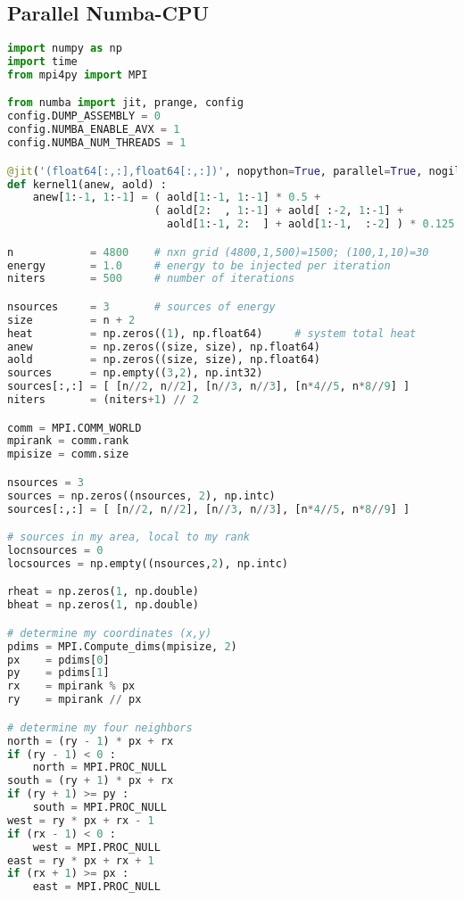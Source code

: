 \subsection{Parallel Numba-CPU}
\begin{lstlisting}[language=Python, caption={Parallel Numba-CPU implementation of the stencil test case.}]
import numpy as np
import time
from mpi4py import MPI   

from numba import jit, prange, config
config.DUMP_ASSEMBLY = 0
config.NUMBA_ENABLE_AVX = 1
config.NUMBA_NUM_THREADS = 1

@jit('(float64[:,:],float64[:,:])', nopython=True, parallel=True, nogil=True) 
def kernel1(anew, aold) :
    anew[1:-1, 1:-1] = ( aold[1:-1, 1:-1] * 0.5 + 
                       ( aold[2:  , 1:-1] + aold[ :-2, 1:-1] +
                         aold[1:-1, 2:  ] + aold[1:-1,  :-2] ) * 0.125 )

n            = 4800    # nxn grid (4800,1,500)=1500; (100,1,10)=30
energy       = 1.0     # energy to be injected per iteration
niters       = 500     # number of iterations

nsources     = 3       # sources of energy
size         = n + 2
heat         = np.zeros((1), np.float64)     # system total heat
anew         = np.zeros((size, size), np.float64)
aold         = np.zeros((size, size), np.float64)
sources      = np.empty((3,2), np.int32)
sources[:,:] = [ [n//2, n//2], [n//3, n//3], [n*4//5, n*8//9] ]
niters       = (niters+1) // 2

comm = MPI.COMM_WORLD
mpirank = comm.rank
mpisize = comm.size

nsources = 3
sources = np.zeros((nsources, 2), np.intc)
sources[:,:] = [ [n//2, n//2], [n//3, n//3], [n*4//5, n*8//9] ]

# sources in my area, local to my rank
locnsources = 0
locsources = np.empty((nsources,2), np.intc)

rheat = np.zeros(1, np.double)
bheat = np.zeros(1, np.double)

# determine my coordinates (x,y)
pdims = MPI.Compute_dims(mpisize, 2)
px    = pdims[0]
py    = pdims[1]
rx    = mpirank % px
ry    = mpirank // px

# determine my four neighbors
north = (ry - 1) * px + rx
if (ry - 1) < 0 :
    north = MPI.PROC_NULL
south = (ry + 1) * px + rx
if (ry + 1) >= py :
    south = MPI.PROC_NULL
west = ry * px + rx - 1
if (rx - 1) < 0 :
    west = MPI.PROC_NULL
east = ry * px + rx + 1
if (rx + 1) >= px :
    east = MPI.PROC_NULL


\end{lstlisting}
